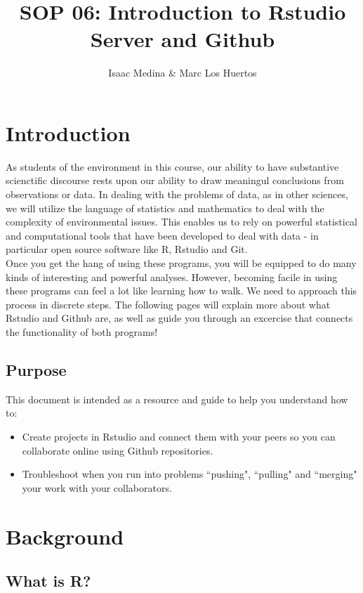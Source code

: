 \documentclass{article}\usepackage[]{graphicx}\usepackage[]{color}
\title{SOP 06: Introduction to Rstudio Server and Github}
\author{Isaac Medina \& Marc Los Huertos}
\begin{document}
\maketitle

\section{Introduction}
As students of the environment in this course, our ability to have substantive scienctific discourse rests upon our ability to draw meaningul conclusions from observations or data. In dealing with the problems of data, as in other sciences, we will utilize the language of statistics and mathematics to deal with the complexity of environmental issues. This enables us to rely on powerful statistical and computational tools that have been developed to deal with data - in particular open source software like R, Rstudio and Git. \\
Once you get the hang of using these programs, you will be equipped to do many kinds of interesting and powerful analyses. However, becoming facile in using these programs can feel a lot like learning how to walk. We need to approach this process in discrete steps. The following pages will explain more about what Rstudio and Github are, as well as guide you through an excercise that connects the functionality of both programs!

  \subsection{Purpose}
  
This document is intended as a resource and guide to help you understand how to: 
  \begin{itemize}
  \item Create projects in Rstudio and connect them with your peers so you can collaborate online using Github repositories. 
  \item Troubleshoot when you run into problems ``pushing", ``pulling" and ``merging" your work with your collaborators.
  \end{itemize}
\section{Background}

  \subsection{What is R?}
\end{document}
